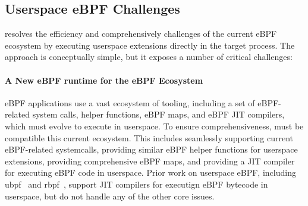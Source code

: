 \subsection{Userspace eBPF Challenges} \label{sec:challenges:details}

\sys{} resolves the efficiency and comprehensively challenges of the current eBPF ecosystem by executing userspace extensions directly in the target process.   The approach is conceptually simple, but it exposes a number of critical challenges: 


\paragraph{A New eBPF runtime for the eBPF Ecosystem} eBPF applications use a vast ecosystem of tooling, including a set of eBPF-related system calls, helper functions, eBPF maps, and eBPF JIT compilers, which must evolve to execute in userspace.  To ensure comprehensiveness, \sys{} must be  compatible this current ecosystem.  This includes seamlessly supporting current eBPF-related systemcalls, providing similar eBPF helper functions for userspace extensions, providing comprehensive eBPF maps, and providing a JIT compiler for executing eBPF code in userspace.  Prior work on userspace eBPF, including ubpf~\cite{ubpf} and rbpf~\cite{rbpf}, support JIT compilers for executign eBPF bytecode in userspace, but do not handle any of the other core issues. 


